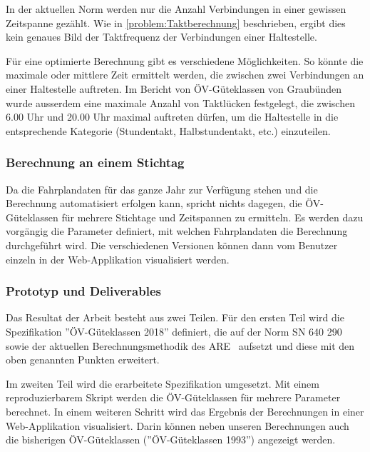 In der aktuellen Norm werden nur die Anzahl Verbindungen in einer gewissen Zeitspanne gezählt.
Wie in \ref{problem:Taktberechnung} beschrieben, ergibt dies kein genaues Bild der Taktfrequenz der Verbindungen einer Haltestelle.

Für eine optimierte Berechnung gibt es verschiedene Möglichkeiten.
So könnte die maximale oder mittlere Zeit ermittelt werden, die zwischen zwei Verbindungen an einer Haltestelle auftreten.
Im Bericht von ÖV-Güteklassen von Graubünden~\cite{oev-guteklasse-gr} wurde ausserdem eine maximale Anzahl von Taktlücken festgelegt, die zwischen 6.00 Uhr und 20.00 Uhr maximal auftreten dürfen, um die Haltestelle in die entsprechende Kategorie (Stundentakt, Halbstundentakt, etc.) einzuteilen.


\subsubsection{Berechnung an einem Stichtag}
\label{solution:Berechnung an einem Stichtag}

Da die Fahrplandaten für das ganze Jahr zur Verfügung stehen und die Berechnung automatisiert erfolgen kann, spricht nichts dagegen, die ÖV-Güteklassen für mehrere Stichtage und Zeitspannen zu ermitteln.
Es werden dazu vorgängig die Parameter definiert, mit welchen Fahrplandaten die Berechnung durchgeführt wird.
Die verschiedenen Versionen können dann vom Benutzer einzeln in der Web-Applikation visualisiert werden.

\subsubsection{Prototyp und Deliverables}
\label{Ziele und Unterziele:Prototyp und Deliverables}

Das Resultat der Arbeit besteht aus zwei Teilen.
Für den ersten Teil wird die Spezifikation ''\acs{ÖV}-Güteklassen 2018'' definiert, die auf der Norm SN 640 290~\cite{sn640290} sowie der aktuellen Berechnungsmethodik des \ac{ARE}~\cite{berechnung_are} aufsetzt und diese mit den oben genannten Punkten erweitert.

Im zweiten Teil wird die erarbeitete Spezifikation umgesetzt.
Mit einem reproduzierbarem Skript werden die \acs{ÖV}-Güteklassen für mehrere Parameter berechnet.
In einem weiteren Schritt wird das Ergebnis der Berechnungen in einer Web-Applikation visualisiert.
Darin können neben unseren Berechnungen auch die bisherigen \acs{ÖV}-Güteklassen (''\acs{ÖV}-Güteklassen 1993'') angezeigt werden.

